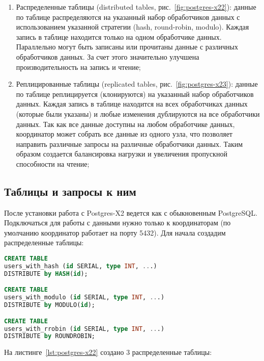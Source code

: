 \begin{enumerate}
  \item Распределенные таблицы (distributed tables, рис.~\ref{fig:postgres-x22}): данные по таблице распределяются на указанный набор обработчиков данных с использованием указанной стратегии (hash, round-robin, modulo). Каждая запись в таблице находится только на одном обработчике данных. Параллельно могут быть записаны или прочитаны данные с различных обработчиков данных. За счет этого значительно улучшена производительность на запись и чтение;
  \item Реплицированные таблицы (replicated tables, рис.~\ref{fig:postgres-x23}): данные по таблице реплицируется (клонируются) на указанный набор обработчиков данных. Каждая запись в таблице находится на всех обработчиках данных (которые были указаны) и любые изменения дублируются на все обработчики данных. Так как все данные доступны на любом обработчике данных, координатор может собрать все данные из одного узла, что позволяет направить различные запросы на различные обработчики данных. Таким образом создается балансировка нагрузки и увеличения пропускной способности на чтение;
\end{enumerate}

\subsection{Таблицы и запросы к ним}

После установки работа с Postgres-X2 ведется как с обыкновенным PostgreSQL. Подключаться для работы с данными нужно только к координаторам (по умолчанию координатор работает на порту 5432). Для начала создадим распределенные таблицы:

\begin{lstlisting}[language=SQL,label=lst:postgres-x22,caption=Создание распределенных таблиц]
CREATE TABLE
users_with_hash (id SERIAL, type INT, ...)
DISTRIBUTE by HASH(id);

CREATE TABLE
users_with_modulo (id SERIAL, type INT, ...)
DISTRIBUTE by MODULO(id);

CREATE TABLE
users_with_rrobin (id SERIAL, type INT, ...)
DISTRIBUTE by ROUNDROBIN;
\end{lstlisting}

На листинге~\ref{lst:postgres-x22} создано 3 распределенные таблицы:


